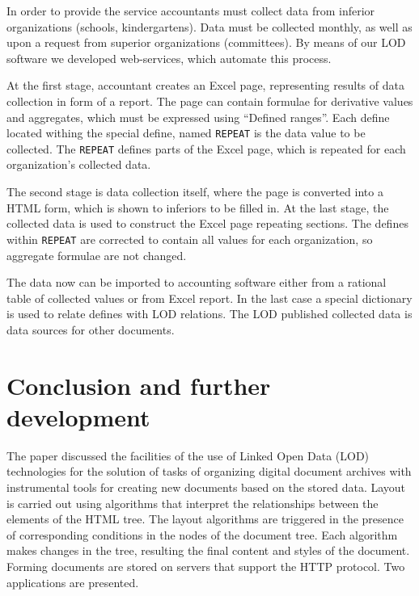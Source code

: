 \documentclass[conference,a4paper]{IEEEtran}
\providecommand\url[1]{\texttt{#1}}
\begin{document}
In order to provide the service accountants must collect data from inferior organizations (schools, kindergartens).  Data must be collected monthly, as well as upon a request from superior organizations (committees).  By means of our LOD software we developed web-services, which automate this process.

At the first stage, accountant creates an Excel page, representing results of data collection in form of a report.  The page can contain formulae for derivative values and aggregates, which must be expressed using ``Defined ranges''.  Each define located withing the special define, named \texttt{REPEAT} is the data value to be collected.  The \texttt{REPEAT} defines parts of the Excel page, which is repeated for each organization's collected data.

The second stage is data collection itself, where the page is converted into a HTML form, which is shown to inferiors to be filled in.  At the last stage, the collected data is used to construct the Excel page repeating sections.  The defines within \texttt{REPEAT} are corrected to contain all values for each organization, so aggregate formulae are not changed.

The data now can be imported to accounting software either from a rational table of collected values or from Excel report.  In the last case a special dictionary is used to relate defines with LOD relations.  The LOD published collected data is data sources for other documents.


\section{Conclusion and further development}
\label{sec:conc}

The paper discussed the facilities of the use of Linked Open Data (LOD) technologies for the solution of tasks of organizing digital document archives with instrumental tools for creating new documents based on the stored data.  Layout is carried out using algorithms that interpret the relationships between the elements of the HTML tree.  The layout algorithms are triggered in the presence of corresponding conditions in the nodes of the document tree. Each algorithm makes changes in the tree, resulting the final content and styles of the document. Forming documents are stored on servers that support the HTTP protocol.  Two applications are presented.
\end{document}
